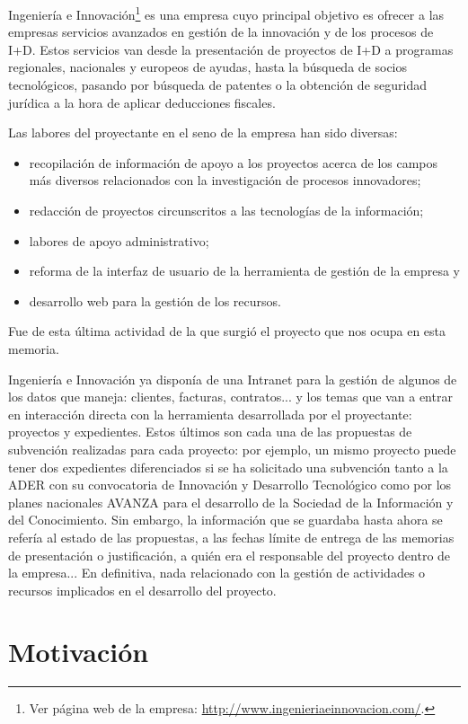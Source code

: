 Ingeniería e Innovación\footnote{Ver página web de la empresa:
\href{http://www.ingenieriaeinnovacion.com/}{
http://www.ingenieriaeinnovacion.com/}.} es una empresa cuyo principal
objetivo es ofrecer a las empresas servicios avanzados en gestión de la
innovación y de los procesos de I+D. Estos servicios van desde la presentación
de proyectos de I+D a programas regionales, nacionales y europeos de ayudas,
hasta la búsqueda de socios tecnológicos, pasando por búsqueda de patentes o la
obtención de seguridad jurídica a la hora de aplicar deducciones fiscales.

Las labores del proyectante en el seno de la empresa han sido diversas:
\begin{itemize}
\item recopilación de información de apoyo a los proyectos acerca de los campos
más diversos relacionados con la investigación de procesos innovadores;
\item redacción de proyectos circunscritos a las tecnologías de la información;
\item labores de apoyo administrativo;
\item reforma de la interfaz de usuario de la herramienta de gestión de la
empresa y
\item desarrollo web para la gestión de los recursos.
\end{itemize}
Fue de esta última actividad de la que surgió el proyecto que nos ocupa en esta
memoria.

Ingeniería e Innovación ya disponía de una Intranet para la gestión de algunos
de los datos que maneja: clientes, facturas, contratos... y los temas
que van a entrar en interacción directa con la herramienta desarrollada por el
proyectante: proyectos y expedientes. Estos últimos son cada una de las
propuestas de subvención realizadas para cada proyecto: por ejemplo, un mismo
proyecto puede tener dos expedientes diferenciados si se ha solicitado una
subvención tanto a la ADER con su convocatoria de Innovación y Desarrollo
Tecnológico como por los planes nacionales AVANZA para el desarrollo de la
Sociedad de la Información y del Conocimiento. Sin embargo, la información que
se guardaba hasta ahora se refería al estado de las propuestas, a las fechas
límite de entrega de las memorias de presentación o justificación, a quién era
el responsable del proyecto dentro de la empresa... En definitiva, nada
relacionado con la gestión de actividades o recursos implicados en el
desarrollo del proyecto.

\section{Motivación}

